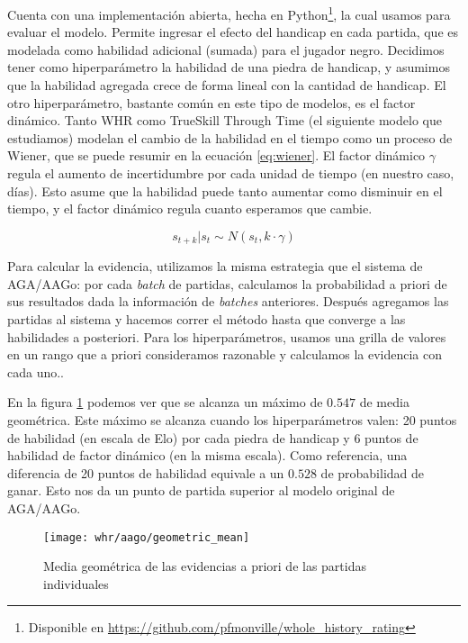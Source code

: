 \documentclass[a4paper,10pt]{report}
\begin{document}
Cuenta con una implementación abierta, hecha en Python\footnote{Disponible en \url{https://github.com/pfmonville/whole_history_rating}}, la cual usamos para evaluar el modelo.
Permite ingresar el efecto del handicap en cada partida, que es modelada como habilidad adicional (sumada) para el jugador negro.
Decidimos tener como hiperparámetro la habilidad de una piedra de handicap, y asumimos que la habilidad agregada crece de forma lineal con la cantidad de handicap.
El otro hiperparámetro, bastante común en este tipo de modelos, es el factor dinámico.
Tanto WHR como TrueSkill Through Time (el siguiente modelo que estudiamos) modelan el cambio de la habilidad en el tiempo como un proceso de Wiener, que se puede resumir en la ecuación \ref{eq:wiener}.
El factor dinámico $\gamma$ regula el aumento de incertidumbre por cada unidad de tiempo (en nuestro caso, días).
Esto asume que la habilidad puede tanto aumentar como disminuir en el tiempo, y el factor dinámico regula cuanto esperamos que cambie.

\begin{equation}\label{eq:wiener}
	s_{t+k} | s_t \sim N(s_t, k \cdot \gamma)
\end{equation}

Para calcular la evidencia, utilizamos la misma estrategia que el sistema de AGA/AAGo: por cada \textit{batch} de partidas, calculamos la probabilidad a priori de sus resultados dada la información de \textit{batches} anteriores. Después agregamos las partidas al sistema y hacemos correr el método hasta que converge a las habilidades a posteriori.
Para los hiperparámetros, usamos una grilla de valores en un rango que a priori consideramos razonable y calculamos la evidencia con cada uno..

En la figura \ref{fig:whr-evidence} podemos ver que se alcanza un máximo de $0.547$ de media geométrica. Este máximo se alcanza cuando los hiperparámetros valen: 20 puntos de habilidad (en escala de Elo) por cada piedra de handicap y 6 puntos de habilidad de factor dinámico (en la misma escala).
Como referencia, una diferencia de 20 puntos de habilidad equivale a un $0.528$ de probabilidad de ganar.
Esto nos da un punto de partida superior al modelo original de AGA/AAGo.

\begin{figure}
	\centering
	\texttt{[image: whr/aago/geometric\_mean]}
	\caption{Media geométrica de las evidencias a priori de las partidas individuales}
	\label{fig:whr-evidence}
\end{figure}
\end{document}
